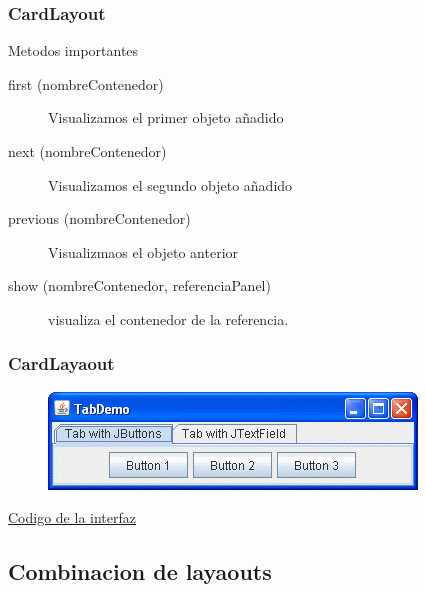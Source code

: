 \documentclass{beamer}
\begin{document}
\begin{frame}
\frametitle{CardLayout}
\begin{block}{Metodos importantes}
\begin{description}
\item[first (nombreContenedor)] Visualizamos el primer objeto añadido
\item[next (nombreContenedor)] Visualizamos el segundo objeto añadido
\item[previous (nombreContenedor)] Visualizmaos el objeto anterior
\item[show (nombreContenedor, referenciaPanel) ] visualiza el contenedor de la referencia.
\end{description}
\end{block}

\end{frame}

\begin{frame}[fragile]
    \frametitle{CardLayaout}
  \begin{figure}
\includegraphics[scale=0.7]{imagenes/cl.png}
\end{figure}  
\begin{center}{\color{blue}
\href{https://docs.oracle.com/javase/tutorial/displayCode.html?code=https://docs.oracle.com/javase/tutorial/uiswing/examples/layout/TabDemoProject/src/layout/TabDemo.java}
{Codigo de la interfaz}}
\end{center}
\end{frame}




\subsection*{Combinacion de layaouts}
\end{document}
